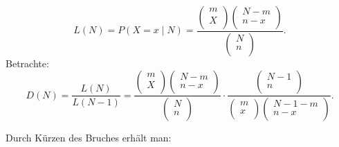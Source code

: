 \documentclass[10pt]{article}
\newenvironment{BSP}[1][]
{\begin{Beispiel}[frametitle=#1]}{\end{Beispiel}}
\begin{document}
\begin{BSP}[Beispiel 1.3.9 (Schätzung der Populationsgröße mit der Capture/Recapture-Methode)]
		
		\begin{equation*}
			L(N) = P(X=x\mid N) =\frac{\left(
				\begin{array}{c}
					m\\
					X\\
				\end{array}
				\right) 
				\left(
				\begin{array}{c}
					N-m\\
					n-x\\
				\end{array}
				\right)}{
				\left(
				\begin{array}{c}
					N\\
					n\\
				\end{array}
				\right)}.
		\end{equation*}
		Betrachte:
		\begin{equation*}
			D(N) = \frac{L(N)}{L(N-1)} = \frac{\left(
				\begin{array}{c}
					m\\
					X\\
				\end{array}
				\right) 
				\left(
				\begin{array}{c}
					N-m\\
					n-x\\
				\end{array}
				\right)}{
				\left(
				\begin{array}{c}
					N\\
					n\\
				\end{array}
				\right)} \cdot 
			\frac{\left(
				\begin{array}{c}
					N-1\\
					n\\
				\end{array}
				\right)}{
				\left(
				\begin{array}{c}
					m\\
					x\\
				\end{array}
				\right)
				\left(
				\begin{array}{c}
					N-1-m\\
					n-x\\
				\end{array}\right)}.
		\end{equation*}
		
		Durch Kürzen des Bruches erhält man:
		

\end{BSP}
\end{document}
